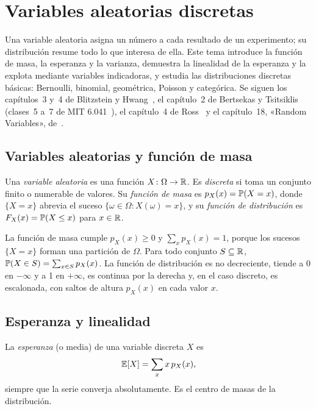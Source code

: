 \chapter{Variables aleatorias discretas}
\label{tema:5}

Una variable aleatoria asigna un número a cada resultado de un experimento; su distribución resume todo lo que interesa de ella. Este tema introduce la función de masa, la esperanza y la varianza, demuestra la linealidad de la esperanza y la explota mediante variables indicadoras, y estudia las distribuciones discretas básicas: Bernoulli, binomial, geométrica, Poisson y categórica. Se siguen los capítulos~3 y~4 de Blitzstein y Hwang~\cite{bh}, el capítulo~2 de Bertsekas y Tsitsiklis~\cite{bt} (clases~5 a~7 de MIT 6.041~\cite{mit6041f10}), el capítulo~4 de Ross~\cite{ross} y el capítulo~18, «Random Variables», de~\cite{mcs}.

\section{Variables aleatorias y función de masa}

\begin{definicion}
Una \emph{variable aleatoria} es una función $X\colon\Omega\to\mathbb{R}$. Es \emph{discreta} si toma un conjunto finito o numerable de valores. Su \emph{función de masa} es $p_X(x)=\mathbb{P}(X=x)$, donde $\{X=x\}$ abrevia el suceso $\{\omega\in\Omega: X(\omega)=x\}$, y su \emph{función de distribución} es $F_X(x)=\mathbb{P}(X\le x)$ para $x\in\mathbb{R}$.
\end{definicion}

La función de masa cumple $p_X(x)\ge0$ y $\sum_xp_X(x)=1$, porque los sucesos $\{X=x\}$ forman una partición de $\Omega$. Para todo conjunto $S\subseteq\mathbb{R}$, $\mathbb{P}(X\in S)=\sum_{x\in S}p_X(x)$. La función de distribución es no decreciente, tiende a 0 en $-\infty$ y a 1 en $+\infty$, es continua por la derecha y, en el caso discreto, es escalonada, con saltos de altura $p_X(x)$ en cada valor $x$.

\addtocounter{definicion}{1}%

\section{Esperanza y linealidad}

\begin{definicion}[Esperanza]
La \emph{esperanza} (o media) de una variable discreta $X$ es
\[
\mathbb{E}[X]=\sum_{x}x\,p_X(x),
\]
siempre que la serie converja absolutamente. Es el centro de masas de la distribución.
\end{definicion}

